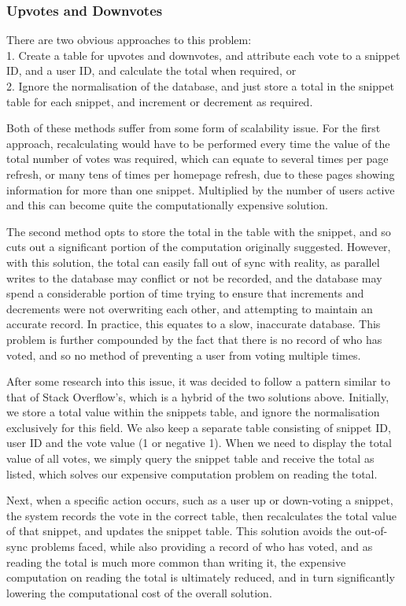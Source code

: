 \subsubsection{Upvotes and Downvotes}
There are two obvious approaches to this problem: \\
	1. Create a table for upvotes and downvotes, and attribute each vote to a snippet ID, and a user ID, and calculate the total when required, or \\
	2. Ignore the normalisation of the database, and just store a total in the snippet table for each snippet, and increment or decrement as required.

Both of these methods suffer from some form of scalability issue. 
For the first approach, recalculating would have to be performed every time the value of the total number of votes was required, which can equate to several times per page refresh, or many tens of times per homepage refresh, due to these pages showing information for more than one snippet.
Multiplied by the number of users active and this can become quite the computationally expensive solution.

The second method opts to store the total in the table with the snippet, and so cuts out a significant portion of the computation originally suggested.
However, with this solution, the total can easily fall out of sync with reality, as parallel writes to the database may conflict or not be recorded, and the database may spend a considerable portion of time trying to ensure that increments and decrements were not overwriting each other, and attempting to maintain an accurate record.
In practice, this equates to a slow, inaccurate database. This problem is further compounded by the fact that there is no record of who has voted, and so no method of preventing a user from voting multiple times.

After some research into this issue, it was decided to follow a pattern similar to that of Stack Overflow's, which is a hybrid of the two solutions above. 
Initially, we store a total value within the snippets table, and ignore the normalisation exclusively for this field.
We also keep a separate table consisting of snippet ID, user ID and the vote value (1 or negative 1). 
When we need to display the total value of all votes, we simply query the snippet table and receive the total as listed, which solves our expensive computation problem on reading the total.

Next, when a specific action occurs, such as a user up or down-voting a snippet, the system records the vote in the correct table, then recalculates the total value of that snippet, and updates the snippet table. 
This solution avoids the out-of-sync problems faced, while also providing a record of who has voted, and as reading the total is much more common than writing it, the expensive computation on reading the total is ultimately reduced, and in turn significantly lowering the computational cost of the overall solution.

